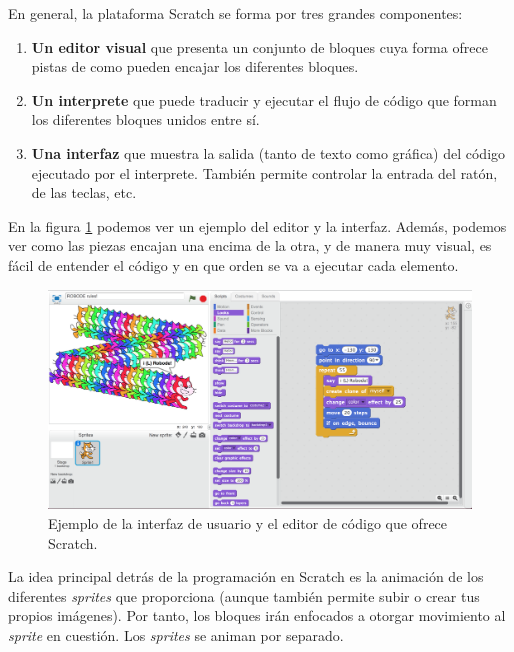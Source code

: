 En general, la plataforma Scratch se forma por tres grandes componentes:
\begin{enumerate}
	\item \textbf{Un editor visual} que presenta un conjunto de bloques cuya forma ofrece pistas de como pueden encajar los diferentes bloques.
	\item \textbf{Un interprete} que puede traducir y ejecutar el flujo de código que forman los diferentes bloques unidos entre sí.
	\item \textbf{Una interfaz} que muestra la salida (tanto de texto como gráfica) del código ejecutado por el interprete. También permite controlar la entrada del ratón, de las teclas, etc.
\end{enumerate}

En la figura \ref{fig:scratch-example} podemos ver un ejemplo del editor y la interfaz. Además, podemos ver como las piezas encajan una encima de la otra, y de manera muy visual, es fácil de entender el código y en que orden se va a ejecutar cada elemento.

\begin{figure}[!ht]
	\begin{centering}
		\includegraphics[width=1\textwidth]{images/scratch-example.png}
			\caption{Ejemplo de la interfaz de usuario y el editor de código que ofrece Scratch.}
				\label{fig:scratch-example}
	\end{centering}
\end{figure}

La idea principal detrás de la programación en Scratch es la animación de los diferentes \emph{sprites} que proporciona (aunque también permite subir o crear tus propios imágenes). Por tanto, los bloques irán enfocados a otorgar movimiento al \emph{sprite} en cuestión. Los \emph{sprites} se animan por separado.

